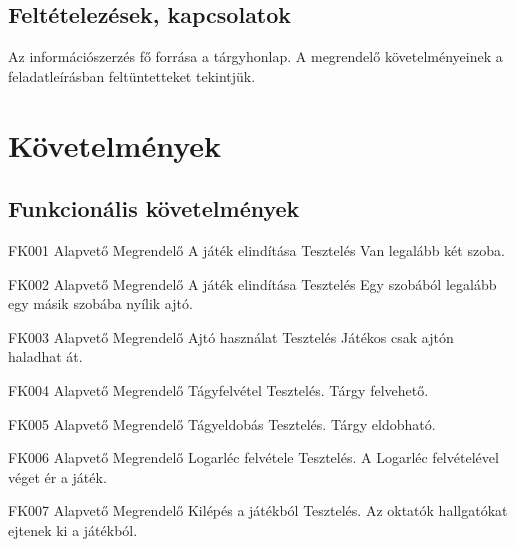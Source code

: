 \subsection{Feltételezések, kapcsolatok}
Az információszerzés fő forrása a tárgyhonlap.
A megrendelő követelményeinek a feladatleírásban feltüntetteket tekintjük.


\section{Követelmények}
\subsection{Funkcionális követelmények}
\begin{funkovetelmeny}
	{FK001}
	{Alapvető}
	{Megrendelő}
	{A játék elindítása}
	{Tesztelés}
	{Van legalább két szoba.}
\end{funkovetelmeny}
\begin{funkovetelmeny}
	{FK002}
	{Alapvető}
	{Megrendelő}
	{A játék elindítása}
	{Tesztelés}
	{Egy szobából legalább egy másik szobába nyílik ajtó.}
\end{funkovetelmeny}
\begin{funkovetelmeny}
	{FK003}
	{Alapvető}
	{Megrendelő}
	{Ajtó használat}
	{Tesztelés}
	{Játékos csak ajtón haladhat át.}
\end{funkovetelmeny}
\begin{funkovetelmeny}
	{FK004}
	{Alapvető}
	{Megrendelő}
	{Tágyfelvétel}
	{Tesztelés.}
	{Tárgy felvehető.}
\end{funkovetelmeny}
\begin{funkovetelmeny}
	{FK005}
	{Alapvető}
	{Megrendelő}
	{Tágyeldobás}
	{Tesztelés.}
	{Tárgy eldobható.}
\end{funkovetelmeny}
\begin{funkovetelmeny}
	{FK006}
	{Alapvető}
	{Megrendelő}
	{Logarléc felvétele}
	{Tesztelés.}
	{A Logarléc felvételével véget ér a játék.}
\end{funkovetelmeny}
\begin{funkovetelmeny}
	{FK007}
	{Alapvető}
	{Megrendelő}
	{Kilépés a játékból}
	{Tesztelés.}
	{Az oktatók hallgatókat ejtenek ki a játékból.}
\end{funkovetelmeny}
